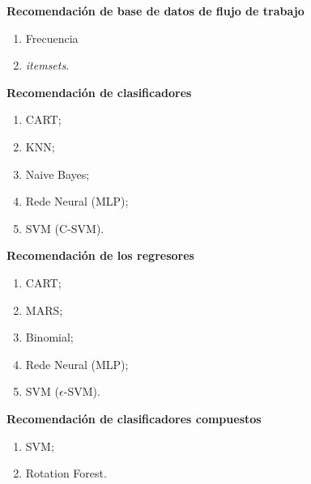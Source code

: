 \begin{frame}
	\begin{block}{}
		\textbf{Recomendación de base de datos de flujo de trabajo}
		\begin{enumerate}
			\item Frecuencia
			\item \emph{itemsets}.	
		\end{enumerate}
	\end{block}
\end{frame}


\begin{frame}
	\begin{block}{}
		\textbf{Recomendación de clasificadores}
		\begin{enumerate}
			\item CART;
			\item KNN;
			\item Naive Bayes;
			\item Rede Neural (MLP);
			\item SVM (C-SVM).		
		\end{enumerate}
	\end{block}
\end{frame}

\begin{frame}
	\begin{block}{}
		\textbf{Recomendación de los regresores}
		\begin{enumerate}
			\item CART;
			\item MARS;
			\item Binomial;
			\item Rede Neural (MLP);
			\item SVM (\(\epsilon\)-SVM).		
		\end{enumerate}
	\end{block}
\end{frame}

\begin{frame}
	\begin{block}{}
		\textbf{Recomendación de clasificadores compuestos}
		\begin{enumerate}
			\item SVM;
			\item Rotation Forest.		
		\end{enumerate}
	\end{block}
\end{frame}
